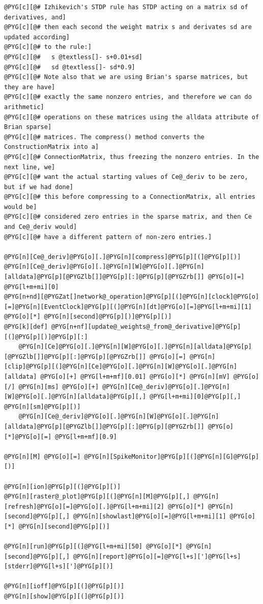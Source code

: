 \documentclass[letterpaper,10pt,english]{manual}
\begin{document}
\begin{Verbatim}[commandchars=@\[\]]
@PYG[c][@# Izhikevich's STDP rule has STDP acting on a matrix sd of derivatives, and]
@PYG[c][@# then each second the weight matrix s and derivates sd are updated according]
@PYG[c][@# to the rule:]
@PYG[c][@#   s @textless[]- s+0.01+sd]
@PYG[c][@#   sd @textless[]- sd*0.9]
@PYG[c][@# Note also that we are using Brian's sparse matrices, but they are have]
@PYG[c][@# exactly the same nonzero entries, and therefore we can do arithmetic]
@PYG[c][@# operations on these matrices using the alldata attribute of Brian sparse]
@PYG[c][@# matrices. The compress() method converts the ConstructionMatrix into a]
@PYG[c][@# ConnectionMatrix, thus freezing the nonzero entries. In the next line, we]
@PYG[c][@# want the actual starting values of Ce@_deriv to be zero, but if we had done]
@PYG[c][@# this before compressing to a ConnectionMatrix, all entries would be]
@PYG[c][@# considered zero entries in the sparse matrix, and then Ce and Ce@_deriv would]
@PYG[c][@# have a different pattern of non-zero entries.]

@PYG[n][Ce@_deriv]@PYG[o][.]@PYG[n][compress]@PYG[p][(]@PYG[p][)]
@PYG[n][Ce@_deriv]@PYG[o][.]@PYG[n][W]@PYG[o][.]@PYG[n][alldata]@PYG[p][@PYGZlb[]]@PYG[p][:]@PYG[p][@PYGZrb[]] @PYG[o][=] @PYG[l+m+mi][0]
@PYG[n+nd][@PYGZat[]network@_operation]@PYG[p][(]@PYG[n][clock]@PYG[o][=]@PYG[n][EventClock]@PYG[p][(]@PYG[n][dt]@PYG[o][=]@PYG[l+m+mi][1] @PYG[o][*] @PYG[n][second]@PYG[p][)]@PYG[p][)]
@PYG[k][def] @PYG[n+nf][update@_weights@_from@_derivative]@PYG[p][(]@PYG[p][)]@PYG[p][:]
    @PYG[n][Ce]@PYG[o][.]@PYG[n][W]@PYG[o][.]@PYG[n][alldata]@PYG[p][@PYGZlb[]]@PYG[p][:]@PYG[p][@PYGZrb[]] @PYG[o][=] @PYG[n][clip]@PYG[p][(]@PYG[n][Ce]@PYG[o][.]@PYG[n][W]@PYG[o][.]@PYG[n][alldata] @PYG[o][+] @PYG[l+m+mf][0.01] @PYG[o][*] @PYG[n][mV] @PYG[o][/] @PYG[n][ms] @PYG[o][+] @PYG[n][Ce@_deriv]@PYG[o][.]@PYG[n][W]@PYG[o][.]@PYG[n][alldata]@PYG[p][,] @PYG[l+m+mi][0]@PYG[p][,] @PYG[n][sm]@PYG[p][)]
    @PYG[n][Ce@_deriv]@PYG[o][.]@PYG[n][W]@PYG[o][.]@PYG[n][alldata]@PYG[p][@PYGZlb[]]@PYG[p][:]@PYG[p][@PYGZrb[]] @PYG[o][*]@PYG[o][=] @PYG[l+m+mf][0.9]

@PYG[n][M] @PYG[o][=] @PYG[n][SpikeMonitor]@PYG[p][(]@PYG[n][G]@PYG[p][)]

@PYG[n][ion]@PYG[p][(]@PYG[p][)]
@PYG[n][raster@_plot]@PYG[p][(]@PYG[n][M]@PYG[p][,] @PYG[n][refresh]@PYG[o][=]@PYG[o][.]@PYG[l+m+mi][2] @PYG[o][*] @PYG[n][second]@PYG[p][,] @PYG[n][showlast]@PYG[o][=]@PYG[l+m+mi][1] @PYG[o][*] @PYG[n][second]@PYG[p][)]

@PYG[n][run]@PYG[p][(]@PYG[l+m+mi][50] @PYG[o][*] @PYG[n][second]@PYG[p][,] @PYG[n][report]@PYG[o][=]@PYG[l+s][']@PYG[l+s][stderr]@PYG[l+s][']@PYG[p][)]

@PYG[n][ioff]@PYG[p][(]@PYG[p][)]
@PYG[n][show]@PYG[p][(]@PYG[p][)]
\end{Verbatim}
\end{document}
